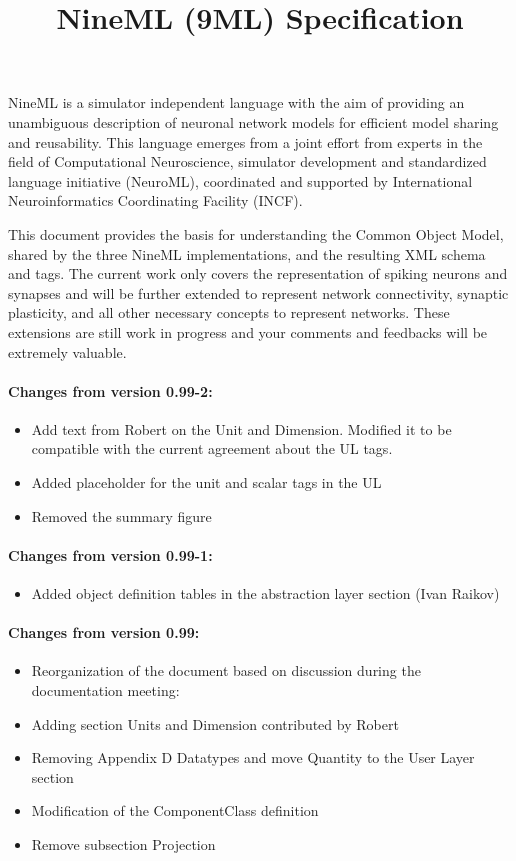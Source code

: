 \documentclass{article}
\begin{document}
\title{NineML (9ML) Specification}

\newpage
\pagestyle{plain}

\newpage

\abstract

NineML is a simulator independent language with the aim of providing an
unambiguous description of neuronal network models for efficient model sharing
and reusability. This language emerges from a joint effort from experts in the
field of Computational Neuroscience, simulator development and standardized
language initiative (NeuroML), coordinated and supported by International
Neuroinformatics Coordinating Facility (INCF).

This document provides the basis for understanding the Common Object
Model, shared by the three NineML implementations, and the resulting XML
schema and tags. The current work only covers the representation of
spiking neurons and synapses and will be further extended to represent
network connectivity, synaptic plasticity, and all other necessary
concepts to represent networks.  These extensions are still work in
progress and your comments and feedbacks will be extremely valuable.

\newpage
\tableofcontents

\newpage
\vskip 1in
\paragraph{Changes from version 0.99-2:}
\begin{itemize}
\item Add text from Robert on the Unit and Dimension. Modified it to be compatible with the current agreement about the UL tags.
\item Added placeholder for the unit and scalar tags in the UL
\item Removed the summary figure
\end{itemize}

\paragraph{Changes from version 0.99-1:}
\begin{itemize}
\item Added object definition tables in the abstraction layer section   (Ivan Raikov)
\end{itemize}

\paragraph{Changes from version 0.99:}
\begin{itemize}
\item Reorganization of the document based on discussion during the documentation meeting:
\item Adding section Units and Dimension contributed by Robert
\item Removing Appendix D Datatypes and move Quantity to the User Layer section
\item Modification of the ComponentClass definition
\item Remove subsection Projection
\end{itemize}
\end{document}
